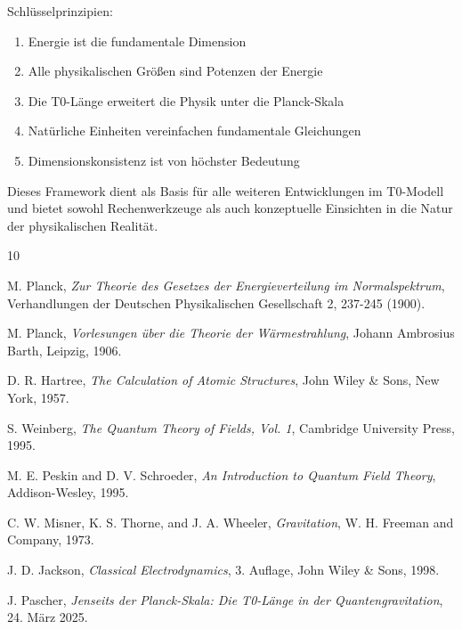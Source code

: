 	Schlüsselprinzipien:
	\begin{enumerate}
		\item Energie ist die fundamentale Dimension
		\item Alle physikalischen Größen sind Potenzen der Energie
		\item Die T0-Länge erweitert die Physik unter die Planck-Skala
		\item Natürliche Einheiten vereinfachen fundamentale Gleichungen
		\item Dimensionskonsistenz ist von höchster Bedeutung
	\end{enumerate}
	
	Dieses Framework dient als Basis für alle weiteren Entwicklungen im T0-Modell und bietet sowohl Rechenwerkzeuge als auch konzeptuelle Einsichten in die Natur der physikalischen Realität.
	
	
	\begin{thebibliography}{10}
		
		M. Planck,
		\textit{Zur Theorie des Gesetzes der Energieverteilung im Normalspektrum},
		Verhandlungen der Deutschen Physikalischen Gesellschaft 2, 237-245 (1900).
		
		M. Planck,
		\textit{Vorlesungen über die Theorie der Wärmestrahlung},
		Johann Ambrosius Barth, Leipzig, 1906.
		
		D. R. Hartree,
		\textit{The Calculation of Atomic Structures},
		John Wiley \& Sons, New York, 1957.
		
		S. Weinberg,
		\textit{The Quantum Theory of Fields, Vol. 1},
		Cambridge University Press, 1995.
		
		M. E. Peskin and D. V. Schroeder,
		\textit{An Introduction to Quantum Field Theory},
		Addison-Wesley, 1995.
		
		C. W. Misner, K. S. Thorne, and J. A. Wheeler,
		\textit{Gravitation},
		W. H. Freeman and Company, 1973.
		
		J. D. Jackson,
		\textit{Classical Electrodynamics},
		3. Auflage, John Wiley \& Sons, 1998.
		
		J. Pascher,
		\textit{Jenseits der Planck-Skala: Die T0-Länge in der Quantengravitation},
		24. März 2025.
		
	\end{thebibliography}
	